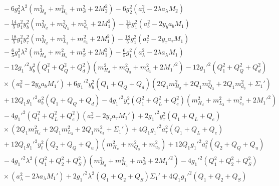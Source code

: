 \documentclass[preprint,amsmath,amssymb,aps,superscriptaddress,prd,
showpacs,floatfix,nofootinbib]{revtex4-1}
\begin{document}
\begin{subequations}
\begin{align}
& {} - 6 g_2^2 \lambda^2 \left ( m_{H_d}^2 + m_{H_u}^2 + m_S^2 + 2 M_2^2
\right ) - 6 g_2^2 \left ( a_\lambda^2 - 2 \lambda a_\lambda M_2 \right )
\nonumber \\
& {} - \frac{14}{5} g_1^2 y_b^2 \left ( m_{H_d}^2 + m_{Q_3}^2 + m_{d_3}^2 +
2 M_1^2 \right ) - \frac{14}{5} g_1^2 \left ( a_b^2 - 2 y_b a_b M_1 \right )
\nonumber \\
& {} - \frac{18}{5} g_1^2 y_\tau^2 \left ( m_{H_d}^2 + m_{L_3}^2 + m_{e_3}^2 +
 2 M_1^2 \right ) - \frac{18}{5} g_1^2 \left ( a_\tau^2 - 2 y_\tau a_\tau M_1
\right ) \nonumber \\
& {} - \frac{6}{5} g_1^2 \lambda^2 \left ( m_{H_d}^2 + m_{H_u}^2 + m_S^2 +
2 M_1^2 \right ) - \frac{6}{5} g_1^2 \left ( a_\lambda^2 -
2 \lambda a_\lambda M_1 \right ) \nonumber \\
& {} - 12 g_1'^2 y_b^2 \left ( Q_1^2 + Q_Q^2 + Q_d^2 \right )
\left ( m_{H_d}^2 + m_{Q_3}^2 + m_{d_3}^2 + 2 M_1'^2 \right ) -12 g_1'^2
\left ( Q_1^2 + Q_Q^2 + Q_d^2 \right ) \nonumber \\
& {} \times \left ( a_b^2 - 2 y_b a_b M_1'\right ) + 6 g_1'^2 y_b^2
\left ( Q_1 + Q_Q + Q_d \right ) \left ( 2 Q_1 m_{H_d}^2 + 2 Q_1 m_{Q_3}^2 +
2 Q_1 m_{d_3}^2 + \Sigma_1' \right ) \nonumber \\
& {} + 12 Q_1 g_1'^2 a_b^2 \left ( Q_1 + Q_Q + Q_d \right ) -
4 g_1'^2 y_\tau^2 \left ( Q_1^2 + Q_L^2 + Q_e^2 \right ) \left ( m_{H_d}^2 +
m_{L_3}^2 + m_{e_3}^2 + 2 M_1'^2 \right ) \nonumber \\
& {} - 4 g_1'^2 \left ( Q_1^2 + Q_L^2 + Q_e^2 \right ) \left ( a_\tau^2 -
2 y_\tau a_\tau M_1' \right ) + 2 g_1'^2 y_\tau^2 \left ( Q_1 + Q_L +Q_e
\right ) \nonumber \\
& {} \times \left ( 2 Q_1 m_{H_d}^2 + 2 Q_1 m_{L_3}^2 + 2 Q_1 m_{e_3}^2 +
\Sigma_1' \right ) + 4 Q_1 g_1'^2 a_\tau^2 \left ( Q_1 + Q_L + Q_e \right )
\nonumber \\
& {} + 12 Q_1 g_1'^2 y_t^2 \left ( Q_2 + Q_Q + Q_u \right ) \left ( m_{H_u}^2
+ m_{Q_3}^2 + m_{u_3}^2 \right ) + 12 Q_1 g_1'^2 a_t^2 \left ( Q_2 + Q_Q +
Q_u \right ) \nonumber \\
& {} - 4 g_1'^2 \lambda^2 \left ( Q_1^2 + Q_2^2 + Q_S^2 \right )
\left ( m_{H_d}^2 + m_{H_u}^2 + m_S^2 + 2 M_1'^2 \right ) - 4 g_1'^2
\left ( Q_1^2 + Q_2^2 + Q_S^2 \right ) \nonumber \\
& {} \times \left ( a_\lambda^2 - 2 \lambda a_\lambda M_1' \right ) +
2 g_1'^2 \lambda^2 \left ( Q_1 + Q_2 + Q_S \right ) \Sigma_1' +
4 Q_1 g_1'^2 \left ( Q_1 + Q_2 + Q_S \right ) \nonumber \\

\end{align}
\end{subequations}
\end{document}
